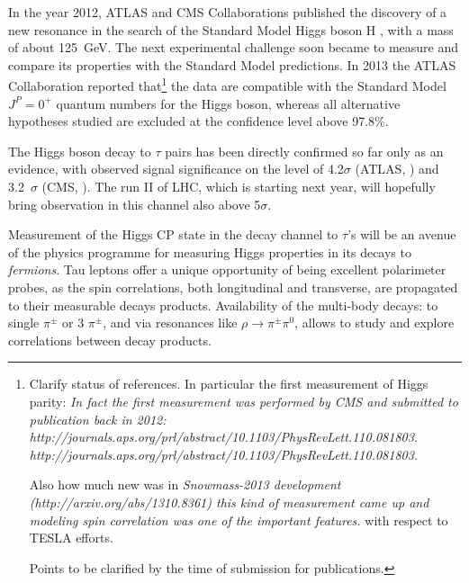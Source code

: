 \documentclass[12pt]{article}
\begin{document}
In the year 2012, ATLAS and CMS Collaborations published the discovery of a new resonance 
\cite{AtlasHiggs2012, CMSHiggs2012} in the search of the Standard Model Higgs boson H \cite{Englert64, Higgs64}, 
with a mass of about 125~GeV. The next experimental challenge soon became to measure and compare
its properties with the Standard Model predictions. In 2013 the ATLAS Collaboration reported 
\cite{AtlasScalar2013} that\footnote{ Clarify status of references. In particular the first measurement of Higgs parity:
{\it In fact the first measurement was performed by CMS and submitted to publication back in 2012:
 http://journals.aps.org/prl/abstract/10.1103/PhysRevLett.110.081803.
http://journals.aps.org/prl/abstract/10.1103/PhysRevLett.110.081803.}

Also how much new was in   {\it Snowmass-2013 development
(http://arxiv.org/abs/1310.8361) this kind of measurement
came up and modeling spin correlation was one of the important features.}
with respect to TESLA efforts.

Points to be clarified by the time of submission for publications.
}
the data are compatible with the Standard Model $J^{P} = 0^{+}$ 
quantum numbers for the Higgs boson, whereas all alternative hypotheses studied 
are excluded at the confidence level above 97.8\%. 

The Higgs boson decay to $\tau$ pairs has been directly confirmed so far only as an evidence, 
with observed signal significance on the level of 4.2$\sigma$ (ATLAS, \cite{ATLASHtautau}) and 3.2~$\sigma$ (CMS, \cite{CMSHTautau}).
The run II of LHC, which is starting next year, will hopefully bring observation in this channel also above 5$\sigma$.    

Measurement of the Higgs CP state in the decay channel to $\tau$'s will be an 
avenue of the physics programme for measuring Higgs properties in its decays to {\it fermions}. Tau leptons offer a unique
opportunity of being excellent polarimeter probes, as the spin correlations, both longitudinal 
and transverse, are propagated to their measurable decays products. 
Availability of the multi-body decays: to single $\pi^\pm$ or 3 $\pi^\pm$, 
and via resonances like $\rho\to \pi^\pm \pi^0$,  allows to study and explore correlations between 
decay products. 
\end{document}
